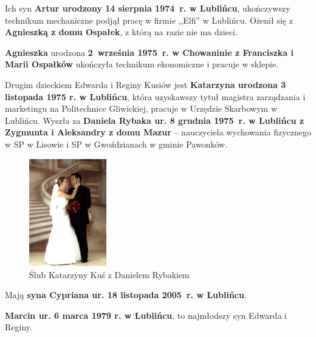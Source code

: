Ich syn \textbf{Artur urodzony 14 sierpnia 1974~r. w Lublińcu}, ukończywszy technikum mechaniczne podjął pracę w firmie ,,Elfi'' w Lublińcu. Ożenił się z \textbf{Agnieszką z domu Ospałek}, z którą na razie nie ma dzieci.

\textbf{Agnieszka} urodzona \textbf{2~września 1975~r. w Chowaninie z Franciszka i Marii Ospałków} ukończyła technikum ekonomiczne i pracuje w sklepie.

Drugim dzieckiem Edwarda i Reginy Kusiów jest \textbf{Katarzyna urodzona 3 listopada 1975 r. w Lublińcu}, która uzyskawszy tytuł magistra zarządzania i marketingu na Politechnice Gliwickiej, pracuje w Urzędzie Skarbowym w Lublińcu. Wyszła za \textbf{Daniela Rybaka ur. 8 grudnia 1975~r. w Lublińcu z Zygmunta i Aleksandry z domu Mazur} -- nauczyciela wychowania fizycznego w SP w Lisowie i SP w Gwoździanach w gminie Pawonków.

\begin{figure} [!h]
\begin{center}
\includegraphics[width=0.3\textwidth]{photo/katarzyna_daniel_rybak_slub.jpg}
\caption{Ślub Katarzyny Kuś z Danielem Rybakiem}
\label{rys:katarzyna_daniel_rybak_slub}
\end{center}
\end{figure}

Mają \textbf{syna Cypriana ur. 18 listopada 2005~r. w Lublińcu}.

\textbf{Marcin ur. 6 marca 1979 r. w Lublińcu}, to najmłodszy syn Edwarda i Reginy.

